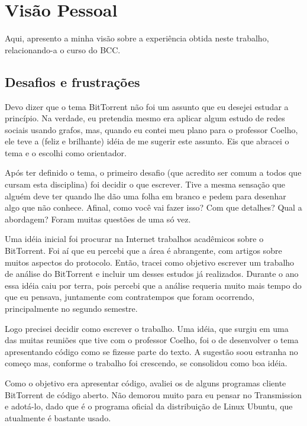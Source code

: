 
\chapter*{Visão Pessoal}

Aqui, apresento a minha visão sobre a experiência obtida neste trabalho, relacionando-a
o curso do BCC.

\section*{Desafios e frustrações}

Devo dizer que o tema BitTorrent não foi um assunto que eu desejei estudar a princípio.
Na verdade, eu pretendia mesmo era aplicar algum estudo de redes sociais usando grafos,
mas, quando eu contei meu plano para o professor Coelho, ele teve a (feliz e brilhante)
idéia de me sugerir este assunto. Eis que abracei o tema e o escolhi como orientador.

Após ter definido o tema, o primeiro desafio (que acredito ser comum a todos que cursam
esta disciplina) foi decidir o que escrever. Tive a mesma sensação que alguém deve ter
quando lhe dão uma folha em branco e pedem para desenhar algo que não conhece. Afinal,
como você vai fazer isso? Com que detalhes? Qual a abordagem? Foram muitas questões de
uma só vez.

Uma idéia inicial foi procurar na Internet trabalhos acadêmicos sobre o BitTorrent. Foi
aí que eu percebi que a área é abrangente, com artigos sobre muitos aspectos do
protocolo. Então, tracei como objetivo escrever um trabalho de análise do BitTorrent e
incluir um desses estudos já realizados. Durante o ano essa idéia caiu por terra,
pois percebi que a análise requeria muito mais tempo do que eu pensava, juntamente com
contratempos que foram ocorrendo, principalmente no segundo semestre.

Logo precisei decidir como escrever o trabalho. Uma idéia, que surgiu em uma das muitas
reuniões que tive com o professor Coelho, foi o de desenvolver o tema apresentando
código como se fizesse parte do texto. A sugestão soou estranha no começo mas, conforme
o trabalho foi crescendo, se consolidou como boa idéia.

Como o objetivo era apresentar código, avaliei os de alguns programas cliente
BitTorrent de código aberto. Não demorou muito para eu pensar no Transmission e
adotá-lo, dado que é o programa oficial da distribuição de Linux Ubuntu, que atualmente
é bastante usado.

